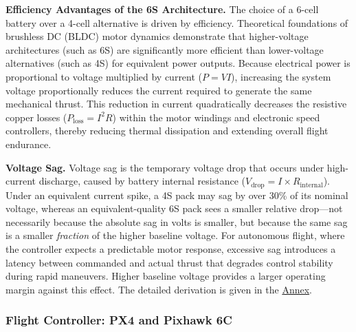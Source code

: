 \textbf{Efficiency Advantages of the 6S Architecture.}
The choice of a 6-cell battery over a 4-cell alternative is driven by efficiency. Theoretical foundations of brushless DC (BLDC) motor dynamics demonstrate that higher-voltage architectures (such as 6S) are significantly more efficient than lower-voltage alternatives (such as 4S) for equivalent power outputs. Because electrical power is proportional to voltage multiplied by current ($P = VI$), increasing the system voltage proportionally reduces the current required to generate the same mechanical thrust. This reduction in current quadratically decreases the resistive copper losses ($P_{\text{loss}} = I^2R$) within the motor windings and electronic speed controllers, thereby reducing thermal dissipation and extending overall flight endurance.\cite{hughes2013electric}


\begin{tcolorbox}[breakable, colback=gray!8, colframe=black!30, arc=0pt,
    boxsep=10pt, left=4pt, right=4pt, top=4pt, bottom=4pt,
    before skip=6pt, after skip=6pt]
\textbf{Voltage Sag.}
Voltage sag is the temporary voltage drop that occurs under high-current discharge, caused by battery internal resistance ($V_{\text{drop}} = I \times R_{\text{internal}}$). Under an equivalent current spike, a 4S pack may sag by over 30\% of its nominal voltage, whereas an equivalent-quality 6S pack sees a smaller relative drop---not necessarily because the absolute sag in volts is smaller, but because the same sag is a smaller \emph{fraction} of the higher baseline voltage.\cite{bershadsky2016propulsion} For autonomous flight, where the controller expects a predictable motor response, excessive sag introduces a latency between commanded and actual thrust that degrades control stability during rapid maneuvers. Higher baseline voltage provides a larger operating margin against this effect. The detailed derivation is given in the \hyperref[sec:annex_hardware]{Annex}.
\end{tcolorbox}

\subsubsection{Flight Controller: PX4 and Pixhawk 6C}

